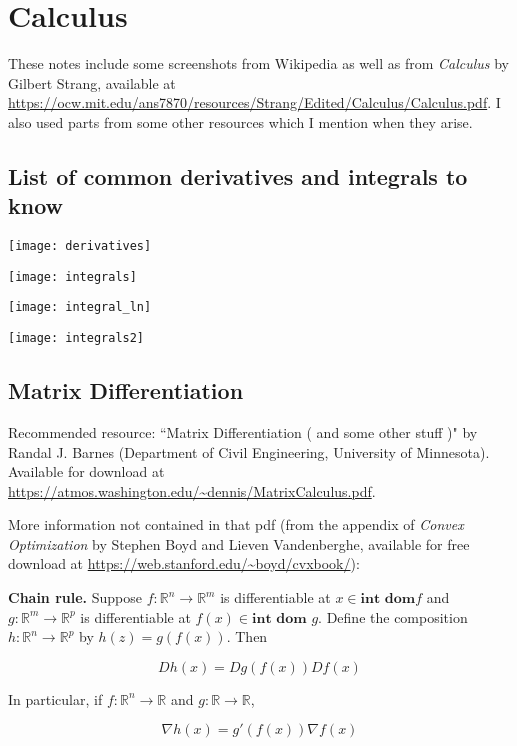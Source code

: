 \section{Calculus}

These notes include some screenshots from Wikipedia as well as from \textit{Calculus} by Gilbert Strang, available at \url{https://ocw.mit.edu/ans7870/resources/Strang/Edited/Calculus/Calculus.pdf}. I also used parts from some other resources which I mention when they arise.

\subsection{List of common derivatives and integrals to know}

\texttt{[image: derivatives]}

\texttt{[image: integrals]}

\texttt{[image: integral\_ln]}

\texttt{[image: integrals2]}

\subsection{Matrix Differentiation}

Recommended resource: ``Matrix Differentiation ( and some other stuff )" by Randal J. Barnes (Department of Civil Engineering, University of Minnesota). Available for download at \url{https://atmos.washington.edu/~dennis/MatrixCalculus.pdf}.

More information not contained in that pdf (from the appendix of \textit{Convex Optimization} by Stephen Boyd and Lieven Vandenberghe, available for free download at \url{https://web.stanford.edu/~boyd/cvxbook/}):

\textbf{Chain rule.} Suppose \(f: \mathbb{R}^n \to \mathbb{R}^m\) is differentiable at \(x \in \textbf{int} \textbf{ dom} f\) and  \(g: \mathbb{R}^m \to \mathbb{R}^p\) is differentiable at \(f(x) \in \textbf{int} \textbf{ dom } g\). Define the composition \(h: \mathbb{R}^n \to \mathbb{R}^p\) by \(h(z) =  g(f(x))\). Then

\[
D h(x) = Dg(f(x)) D f(x)
\]

In particular, if \(f: \mathbb{R}^n \to \mathbb{R}\) and  \(g: \mathbb{R} \to \mathbb{R}\),

\[
\nabla h(x) = g'(f(x)) \nabla f(x)
\]

